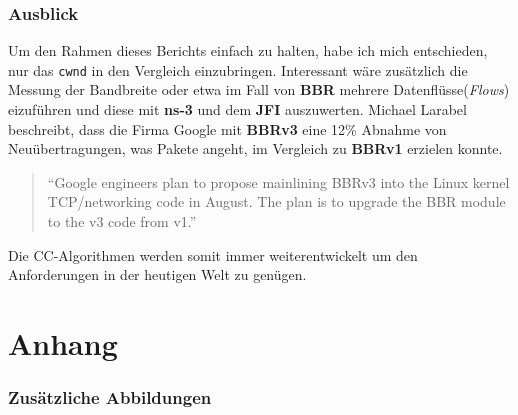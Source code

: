 \documentclass[paper=a4,fontsize=12pt,ngerman]{scrartcl}
\begin{document}
\section{Ausblick}
Um den Rahmen dieses Berichts einfach zu halten, habe ich mich entschieden, nur das \texttt{cwnd} in den Vergleich 
einzubringen. Interessant wäre zusätzlich die Messung der Bandbreite oder etwa im Fall von \textbf{BBR} mehrere Datenflüsse(\textit{Flows}) 
eizuführen und diese mit \textbf{ns-3} und dem \textbf{JFI} auszuwerten. 
Michael Larabel beschreibt, dass die Firma Google mit \textbf{BBRv3} eine 12\% Abnahme von Neuübertragungen, was Pakete angeht,
im Vergleich zu \textbf{BBRv1} erzielen konnte.\cite{larabelBBR}

\begin{quote}
    ``Google engineers plan to propose mainlining BBRv3 into the Linux kernel TCP/networking code in August. 
    The plan is to upgrade the BBR module to the v3 code from v1.'' \cite{larabelBBR}
\end{quote}

Die CC-Algorithmen werden somit immer weiterentwickelt um den Anforderungen in der heutigen Welt zu genügen.



\clearpage
\renewcommand\refname{Literaturverzeichnis}





\clearpage
\appendix
\part*{Anhang}


\section{Zusätzliche Abbildungen}
\end{document}
